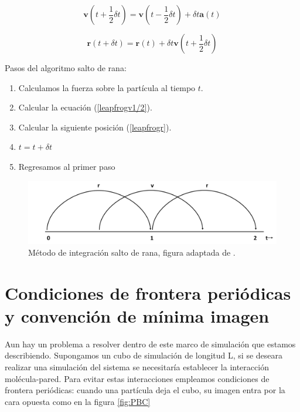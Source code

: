 \begin{equation} \label{leapfrogv1/2}
    \mathbf{v}(t + \frac{1}{2}\delta t)=\mathbf{v}(t - \frac{1}{2}\delta t)+\delta t\mathbf{a}(t)
\end{equation}

\begin{equation} \label{leapfrogr}
    \mathbf{r}(t + \delta t)= \mathbf{r}(t)+\delta t \mathbf{v}(t+\frac{1}{2}\delta t)
\end{equation}

Pasos del algoritmo salto de rana:

\begin{enumerate}
    \item Calculamos la fuerza sobre la partícula al tiempo $t$.
    \item Calcular la ecuación (\ref{leapfrogv1/2}).
    \item Calcular la siguiente posición (\ref{leapfrogr}).
    \item $t = t + \delta t$
    \item Regresamos al primer paso
\end{enumerate}

\begin{figure}[!h]
    \centering
    \includegraphics[width=.8\textwidth,keepaspectratio=true]{MD/leapfrogfig.png}
    \caption{Método de integración salto de rana, figura adaptada de \cite{gromacsdoc}.}
    \label{fig:leapfrog}
\end{figure}

\section{Condiciones de frontera periódicas y convención de mínima imagen}

Aun hay un problema a resolver dentro de este marco de simulación que estamos describiendo. Supongamos un cubo de simulación de longitud L, si se deseara realizar una simulación del sistema se necesitaría establecer la interacción molécula-pared. Para evitar estas interacciones empleamos condiciones de frontera periódicas: cuando una partícula deja el cubo, su imagen entra por la cara opuesta como en la figura \ref{fig:PBC}\\

